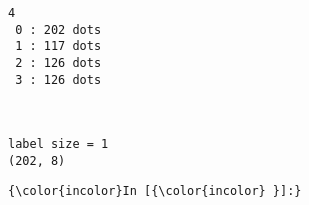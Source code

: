 \documentclass[11pt]{article}
\begin{document}
    \begin{Verbatim}[commandchars=\\\{\}]
4
 0 : 202 dots
 1 : 117 dots
 2 : 126 dots
 3 : 126 dots

    \end{Verbatim}

    \begin{center}
    \end{center}
    { \hspace*{\fill} \\}
    
    \begin{Verbatim}[commandchars=\\\{\}]
label size = 1
(202, 8)

    \end{Verbatim}

    \begin{Verbatim}[commandchars=\\\{\}]
{\color{incolor}In [{\color{incolor} }]:} 
\end{Verbatim}


    
    
    
    
\end{document}
